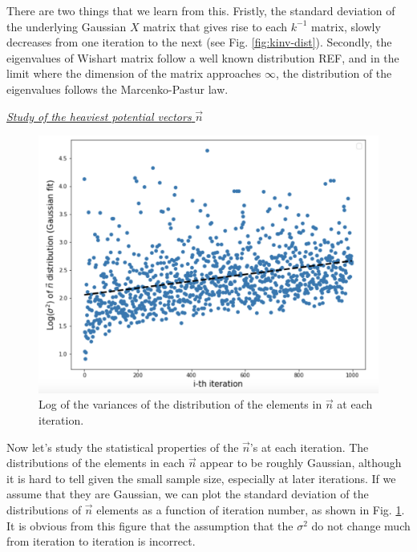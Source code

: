 \documentclass[11pt]{article}
\begin{document}
There are two things that we learn from this. Fristly, the standard deviation of the underlying Gaussian $X$ matrix that gives rise to each $k^{-1}$ matrix, slowly decreases from one iteration to the next (see Fig. \ref{fig:kinv-dist}). Secondly, the eigenvalues of Wishart matrix follow a well known distribution REF, and in the limit where the dimension of the matrix approaches $\infty$, the distribution of the eigenvalues follows the Marcenko-Pastur law.

\begin{center}
    \noindent \underline{\textit{Study of the heaviest potential vectors} $\vec{n}$}
    
\end{center}

\begin{figure}[h]
    \centering
    \includegraphics[width=0.75\linewidth]{figs/nvec_sig_dist.png}
    \caption{Log of the variances of the distribution of the elements in $\vec{n}$ at each iteration.}
    \label{fig:nvec_sig_dist}
\end{figure}

Now let's study the statistical properties of the $\vec{n}$'s at each iteration. The distributions of the elements in each $\vec{n}$ appear to be roughly Gaussian, although it is hard to tell given the small sample size, especially at later iterations.
If we assume that they are Gaussian, we can plot the standard deviation of the distributions of $\vec{n}$ elements as a function of iteration number, as shown in Fig. \ref{fig:nvec_sig_dist}. It is obvious from this figure that the assumption that the $\sigma^2$ do not change much from iteration to iteration is incorrect.
\end{document}
